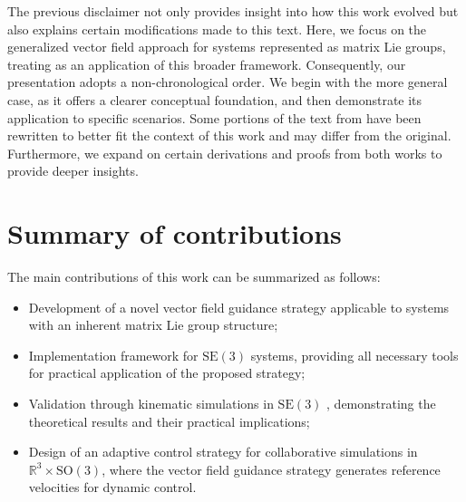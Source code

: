 
The previous disclaimer not only provides insight into how this work evolved but also explains certain modifications made to this text. Here, we focus on the generalized vector field approach for systems represented as matrix Lie groups, treating \citet{Pessoa2024} as an application of this broader framework. Consequently, our presentation adopts a non-chronological order. We begin with the more general case, as it offers a clearer conceptual foundation, and then demonstrate its application to specific scenarios. Some portions of the text from \citet{Pessoa2024} have been rewritten to better fit the context of this work and may differ from the original. Furthermore, we expand on certain derivations and proofs from both works to provide deeper insights.
\section{Summary of contributions}
The main contributions of this work can be summarized as follows:
\begin{itemize}
    \item Development of a novel vector field guidance strategy applicable to systems with an inherent matrix Lie group structure;
    \item Implementation framework for $\text{SE}(3)$ systems, providing all necessary tools for practical application of the proposed strategy;
    \item Validation through kinematic simulations in $\text{SE}(3)$ , demonstrating the theoretical results and their practical implications;
    \item Design of an adaptive control strategy for collaborative simulations in $\mathbb{R}^3 \times \text{SO}(3)$, where the vector field guidance strategy generates reference velocities for dynamic control.
\end{itemize}

